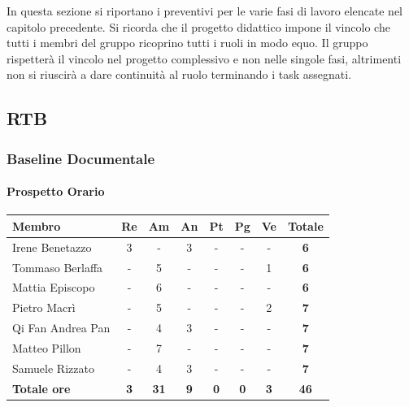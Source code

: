 In questa sezione si riportano i preventivi per le varie fasi di lavoro elencate nel capitolo precedente. \newline
Si ricorda che il progetto didattico impone il vincolo che tutti i membri del gruppo ricoprino tutti i ruoli in modo equo.
Il gruppo rispetterà il vincolo nel progetto complessivo e non nelle singole fasi, 
altrimenti non si riuscirà a dare continuità al ruolo terminando i task assegnati.

\subsection{RTB}
\subsubsection{Baseline Documentale}
\paragraph{Prospetto Orario}
\begin{center}
	\renewcommand{\arraystretch}{1.8} %
	\begin{tabular}{ |m{10em}|c|c|c|c|c|c|c| }
	\hline
	\textbf{Membro} & \textbf{Re} & \textbf{Am} &  \textbf{An} &  \textbf{Pt} &  \textbf{Pg} &  \textbf{Ve} &  \textbf{Totale}\\
    \hline
    Irene Benetazzo   & 3 & - & 3 & - & - & - & \textbf{6} \\
    \hline
    Tommaso Berlaffa  & - & 5 & - & - & - & 1 & \textbf{6} \\
    \hline
    Mattia Episcopo   & - & 6 & - & - & - & - & \textbf{6} \\
    \hline
    Pietro Macrì      & - & 5 & - & - & - & 2 & \textbf{7} \\
    \hline
    Qi Fan Andrea Pan & - & 4 & 3 & - & - & - & \textbf{7} \\
    \hline
    Matteo Pillon     & - & 7 & - & - & - & - & \textbf{7} \\
    \hline
    Samuele Rizzato   & - & 4 & 3 & - & - & - & \textbf{7} \\
    \hline
    \textbf{Totale ore} & \textbf{3} & \textbf{31} &  \textbf{9} &  \textbf{0} &  \textbf{0} &  \textbf{3} &  \textbf{46}\\
    \hline
	\end{tabular}
\end{center}
